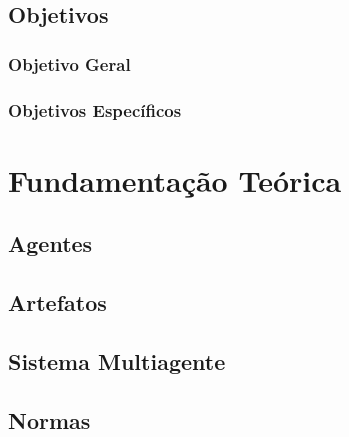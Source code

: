 \documentclass[openright]{normas-utf-tex} %
\begin{document}
		
	
	\section{Objetivos}

		

		\subsection{Objetivo Geral}

			
			
		\subsection{Objetivos Específicos}

			



\chapter{Fundamentação Teórica}
\label{chap:fundteoric}

	\section{Agentes}

		

	\section{Artefatos}

		
 
	\section{Sistema Multiagente}

		

	\section{Normas}

		
\end{document}
